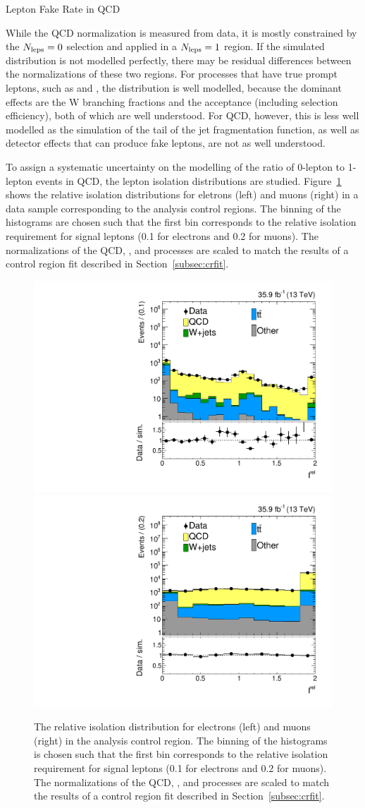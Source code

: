 \begin{section}{Lepton Fake Rate in QCD}

While the QCD normalization is measured from data, it is mostly constrained by the $N_{\mathrm{leps}} = 0$ selection and applied in a $N_{\mathrm{leps}} = 1$ region.
If the simulated \Nleps distribution is not modelled perfectly, there may be residual differences between the normalizations of these two regions.
For processes that have true prompt leptons, such as \ttbar and \Wjets, the \Nleps distribution is well modelled, because the dominant effects are the W branching fractions and the acceptance (including selection efficiency), both of which are well understood. 
For QCD, however, this is less well modelled as the simulation of the tail of the jet fragmentation function, as well as detector effects that can produce fake leptons, are not as well understood.

To assign a systematic uncertainty on the modelling of the ratio of 0-lepton to 1-lepton events in QCD, the lepton isolation distributions are studied.
Figure~\ref{fig:lep_iso} shows the relative isolation distributions for eletrons (left) and muons (right) in a data sample corresponding to the analysis control regions.
The binning of the histograms are chosen such that the first bin corresponds to the relative isolation requirement for signal leptons (0.1 for electrons and 0.2 for muons).
The normalizations of the QCD, \ttbar, and \Wjets processes are scaled to match the results of a control region fit described in Section~\ref{subsec:crfit}.

\begin{figure}[tbp!]
\begin{center}
\includegraphics[angle=0,width=0.45\columnwidth]{fig/iso_els.pdf}
\includegraphics[angle=0,width=0.45\columnwidth]{fig/iso_mus.pdf}
\end{center}
\caption{The relative isolation distribution for electrons (left) and muons (right) in the analysis control region.
The binning of the histograms is chosen such that the first bin corresponds to the relative isolation requirement for signal leptons (0.1 for electrons and 0.2 for muons).
The normalizations of the QCD, \ttbar, and \Wjets processes are scaled to match the results of a control region fit described in Section~\ref{subsec:crfit}.}
\label{fig:lep_iso}
\end{figure}


\end{section}

